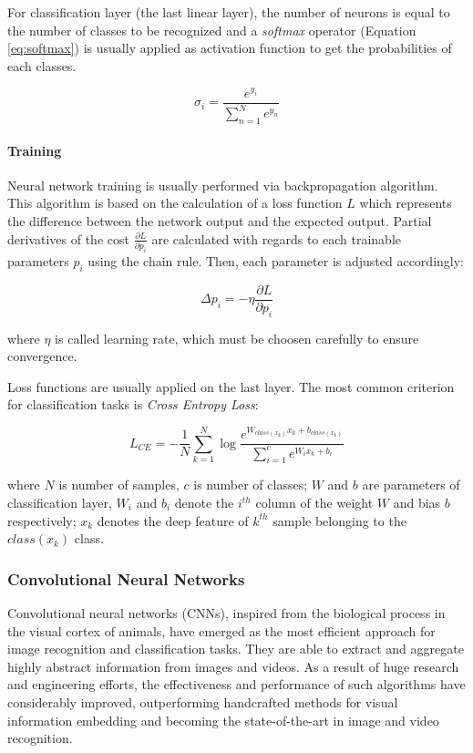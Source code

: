             For classification layer (the last linear layer), the number of neurons is equal to the number of classes to be recognized and a \textit{softmax} operator (Equation \eqref{eq:softmax}) is usually applied as activation function to get the probabilities of each classes.

            \begin{equation}
                \sigma_i = \frac{e^{y_i}}{\sum_{n=1}^{N}e^{y_n}}
                \label{eq:softmax}
            \end{equation}


        \paragraph{Training}
        Neural network training is usually performed via backpropagation algorithm.
        This algorithm is based on the calculation of a loss function $L$ which represents the difference between the network output and the expected output.
        Partial derivatives of the cost $\frac{\partial L}{\partial p_i}$ are calculated with regards to each trainable parameters $p_i$ using the chain rule.
        Then, each parameter is adjusted accordingly:

        \begin{equation}
            \Delta p_i = -\eta\frac{\partial L}{\partial p_i}
        \end{equation}

        where $\eta$ is called learning rate, which must be choosen carefully to ensure convergence.

        Loss functions are usually applied on the last layer.
        The most common criterion for classification tasks is \textit{Cross Entropy Loss}:

        \begin{equation}
            L_{CE} = -\frac{1}{N}\sum_{k=1}^{N}\log\frac{e^{W_{class(x_k)}x_k + b_{class(x_k)}}}{\sum_{i=1}^{c}e^{W_i x_k + b_i}}
        \end{equation}

        where $N$ is number of samples, $c$ is number of classes; $W$ and $b$ are parameters of classification layer, $W_i$ and $b_i$ denote the $i^{th}$ column of the weight $W$ and bias $b$ respectively; $x_k$ denotes the deep feature of $k^{th}$ sample belonging to the $class(x_k)$ class.

    \subsubsection{Convolutional Neural Networks}
        Convolutional neural networks (CNNs), inspired from the biological process in the visual cortex of animals, have emerged as the most efficient approach for image recognition and classification tasks.
        They are able to extract and aggregate highly abstract information from images and videos.
        As a result of huge research and engineering efforts, the effectiveness and performance of such algorithms have considerably improved, outperforming handcrafted methods for visual information embedding and becoming the state-of-the-art in image and video recognition.

